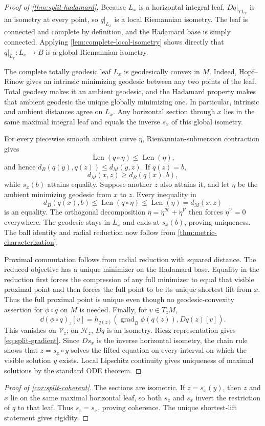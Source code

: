 \begin{proof}[Proof of \cref{thm:split-hadamard}]
Because \(L_x\) is a horizontal integral leaf,
\(Dq|_{TL_x}\) is an isometry at every point, so \(q|_{L_x}\) is a local
Riemannian isometry.  The leaf is connected and complete by definition, and
the Hadamard base is simply connected.  Applying
\cref{lem:complete-local-isometry} shows directly that
\(q|_{L_x}:L_x\to B\) is a global Riemannian isometry.

The complete totally geodesic leaf \(L_x\) is geodesically convex in \(M\).
Indeed, Hopf--Rinow gives an intrinsic minimizing geodesic between any two
points of the leaf.  Total geodesy makes it an ambient geodesic, and the
Hadamard property makes that ambient geodesic the unique globally minimizing
one.  In particular, intrinsic and ambient distances agree on \(L_x\).
Any horizontal section through \(x\) lies in the same maximal integral leaf
and equals the inverse \(s_x\) of this global isometry.

For every piecewise smooth ambient curve \(\eta\), Riemannian-submersion
contraction gives
\[
  \operatorname{Len}(q\circ\eta)\le\operatorname{Len}(\eta),
\]
and hence \(d_B(q(y),q(z))\le d_M(y,z)\).  If \(q(z)=b\),
\[
  d_M(x,z)\ge d_B(q(x),b),
\]
while \(s_x(b)\) attains equality.  Suppose another \(z\) also attains it,
and let \(\eta\) be the ambient minimizing geodesic from \(x\) to \(z\).
Every inequality in
\[
  d_B(q(x),b)
  \le\operatorname{Len}(q\circ\eta)
  \le\operatorname{Len}(\eta)
  =d_M(x,z)
\]
is an equality.  The orthogonal decomposition
\(\dot\eta=\dot\eta^{\mathcal H}+\dot\eta^{\mathcal V}\) then forces
\(\dot\eta^{\mathcal V}=0\) everywhere.  The geodesic stays in \(L_x\) and
ends at \(s_x(b)\), proving uniqueness.  The ball identity and radial
reduction now follow from \cref{thm:metric-characterization}.

Proximal commutation follows from radial reduction with squared distance.  The
reduced objective has a unique minimizer on the Hadamard base.  Equality in
the reduction first forces the compression of any full minimizer to equal that
visible proximal point and then forces the full point to be its unique shortest
lift from \(x\).  Thus the full proximal point is unique even though no
geodesic-convexity assertion for \(\phi\circ q\) on \(M\) is needed.  Finally, for
\(v\in T_zM\),
\[
  \dd(\phi\circ q)_z[v]
  =h_{q(z)}(\operatorname{grad}_B\phi(q(z)),Dq(z)[v]).
\]
This vanishes on \(\mathcal V_z\); on \(\mathcal H_z\), \(Dq\) is an
isometry.  Riesz representation gives \eqref{eq:split-gradient}.  Since
\(Ds_x\) is the inverse horizontal isometry, the chain rule shows that
\(z=s_x\circ y\) solves the lifted equation on every interval on which the
visible solution \(y\) exists.  Local Lipschitz continuity gives uniqueness
of maximal solutions by the standard ODE theorem.
\end{proof}

\begin{proof}[Proof of \cref{cor:split-coherent}]
The sections are isometric.  If \(z=s_x(y)\), then \(z\) and \(x\) lie on
the same maximal horizontal leaf, so both \(s_z\) and \(s_x\) invert the
restriction of \(q\) to that leaf.  Thus \(s_z=s_x\), proving coherence.
The unique shortest-lift statement gives rigidity.
\end{proof}
